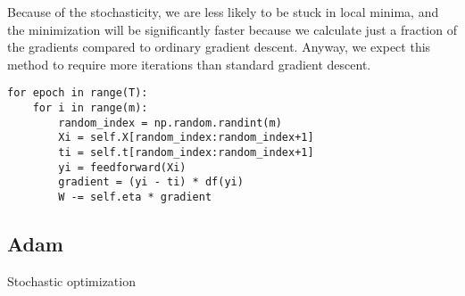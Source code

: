 Because of the stochasticity, we are less likely to be stuck in local minima, and the minimization will be significantly faster because we calculate just a fraction of the gradients compared to ordinary gradient descent. Anyway, we expect this method to require more iterations than standard gradient descent.
\lstset{basicstyle=\scriptsize}
\begin{lstlisting}
for epoch in range(T):
	for i in range(m):
		random_index = np.random.randint(m)
		Xi = self.X[random_index:random_index+1]
		ti = self.t[random_index:random_index+1]
		yi = feedforward(Xi)
		gradient = (yi - ti) * df(yi)
		W -= self.eta * gradient
\end{lstlisting}

\subsection{Adam}
Stochastic optimization
